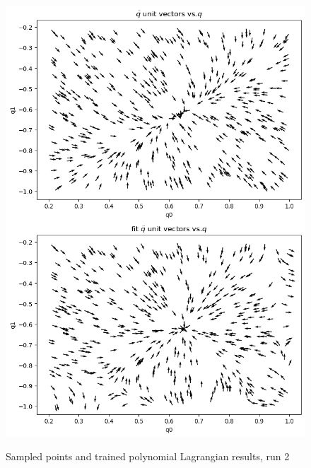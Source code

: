 \documentclass[]{article}
\begin{document}
\begin{figure}[H]
	\caption{Sampled points and trained polynomial Lagrangian results, run 2}
	\centering
	\includegraphics[scale=0.60]{poly-fit-2.png}
	\label{fig:poly-fit-2}
\end{figure}
\end{document}
